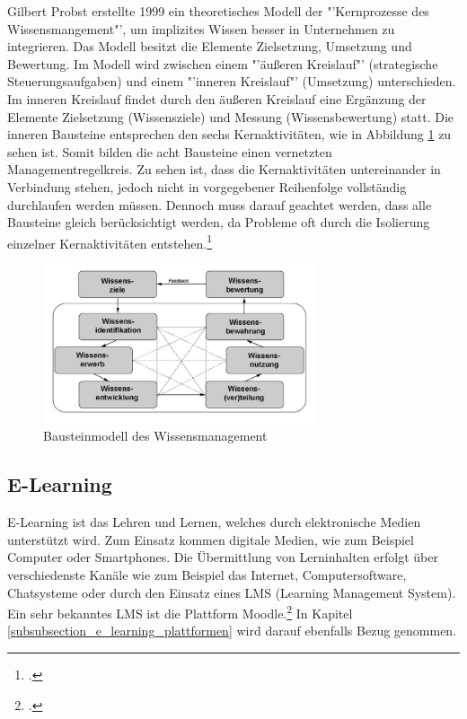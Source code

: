 Gilbert Probst erstellte 1999 ein theoretisches Modell der "'Kernprozesse des Wissensmangement"', um implizites 
Wissen besser in Unternehmen zu integrieren. Das Modell besitzt die Elemente Zielsetzung, Umsetzung und 
Bewertung. Im Modell wird zwischen einem "'äußeren Kreislauf"' (strategische Steuerungsaufgaben) und einem 
"'inneren Kreislauf"' (Umsetzung) unterschieden. Im inneren Kreislauf findet durch den äußeren Kreislauf eine 
Ergänzung der Elemente Zielsetzung (Wissensziele) und Messung (Wissensbewertung) statt. Die inneren Bausteine 
entsprechen den sechs Kernaktivitäten, wie in Abbildung \ref{fig_wissensmanagament_probst} zu sehen ist. Somit 
bilden die acht Bausteine einen vernetzten Managementregelkreis. Zu sehen ist, dass die Kernaktivitäten untereinander 
in Verbindung stehen, jedoch nicht in vorgegebener Reihenfolge vollständig durchlaufen werden müssen. Dennoch 
muss darauf geachtet werden, dass alle Bausteine gleich berücksichtigt werden, da Probleme oft durch die Isolierung 
einzelner Kernaktivitäten entstehen.\footcite[Vgl.][]{wissensmangement_enzyklopaedie-der-wirtschaftsinformatik.de_2012} 

\begin{figure}[h!]
	\centering
	\includegraphics[width=8cm]{kapitel/gruppe2/bilder/wissensmanagament_probst}
	\caption{Bausteinmodell des Wissensmanagement\protect\footnotemark}
	\label{fig_wissensmanagament_probst}
\end{figure}

\subsection{E-Learning}
\label{subsection_e-learning}
E-Learning ist das Lehren und Lernen, welches durch elektronische Medien unterstützt wird. Zum Einsatz kommen digitale Medien, wie zum Beispiel Computer oder Smartphones. Die Übermittlung von Lerninhalten erfolgt über verschiedenste Kanäle wie zum Beispiel das Internet, Computersoftware, Chatsysteme oder durch den Einsatz eines LMS (Learning Management System). Ein sehr bekanntes LMS ist die Plattform Moodle.\footcite[Vgl.][]{e-learning_team025.jimdo.com_2009} In Kapitel \ref{subsubsection_e_learning_plattformen} wird darauf ebenfalls Bezug genommen.

